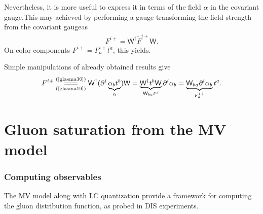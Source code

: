 Nevertheless, it is more useful to express it in terms of the field $\alpha$ in the covariant gauge.This may achieved by performing a gauge transforming the field strength from the covariant gaugeas
\begin{align}\label{glasma30}
    F^{i+}=\textsf{W}^\dagger\widetilde{F}^{i+}\textsf{W}.
\end{align}
On color components $F^{i+}=F^{i+}_at^a$, this yields.
\begin{note}
    Simple manipulations of already obtained results give
    \begin{align*}
        F^{i+}\underset{(\text{\cref{glasma19}})}{\stackrel{(\text{\cref{glasma30}})}{=\joinrel=\joinrel=}}\textsf{W}^\dagger(\partial^i\underbrace{\alpha_bt^b}_{\alpha})\textsf{W}=\underbrace{\textsf{W}^\dagger t^b\textsf{W}}_{\textsf{W}_{ba}t^a}\partial^i\alpha_b=\underbrace{\textsf{W}_{ba}\partial^i\alpha_b}_{F^{i+}_a}t^a.
    \end{align*}
\end{note}

\section{Gluon saturation from the {\sffamily MV model}}
\subsubsection*{Computing observables}
The {\sffamily MV} model along with {\sffamily LC} quantization provide a framework for computing the gluon distribution function, as probed in {\sffamily DIS} experiments. 

